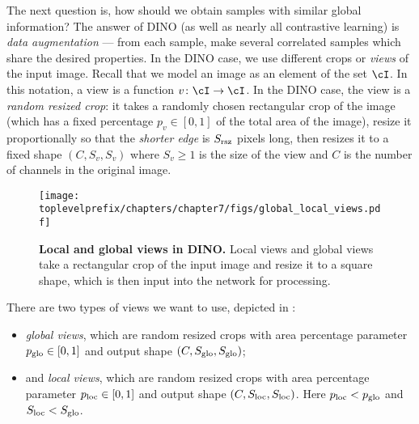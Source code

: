 \documentclass[\toplevelprefix/book-main.tex]{subfiles}
\begin{document}
The next question is, how should we obtain samples with similar global information? The answer of DINO (as well as nearly all contrastive learning) is \textit{data augmentation} --- from each sample, make several correlated samples which share the desired properties. In the DINO case, we use different crops or \textit{views} of the input image. Recall that we model an image as an element of the set \(\cI\). In this notation, a view is a function \(v \colon \cI \to \cI\). In the DINO case, the view is a \textit{random resized crop}: it takes a randomly chosen rectangular crop of the image (which has a fixed percentage \(p_{v} \in [0, 1]\) of the total area of the image), resize it proportionally so that the \textit{shorter edge} is \(S_{\mathrm{rsz}}\) pixels long, then resizes it to a fixed shape \((C, S_{v}, S_{v})\) where \(S_{v} \geq 1\) is the size of the view and \(C\) is the number of channels in the original image. 

\begin{figure}
    \centering 
    \texttt{[image: \\toplevelprefix/chapters/chapter7/figs/global\_local\_views.pdf]}
    \caption{\textbf{Local and global views in DINO.} Local views and global views take a rectangular crop of the input image and resize it to a square shape, which is then input into the network for processing.}
    \label{fig:dino_local_global_views}
\end{figure}

There are two types of views we want to use, depicted in : 
\begin{itemize}
    \item \textit{global views}, which are random resized crops with area percentage parameter \(p_{\mathrm{glo}} \in [0, 1]\) and output shape \((C, S_{\mathrm{glo}}, S_{\mathrm{glo}})\);
    \item and \textit{local views}, which are random resized crops with area percentage parameter \(p_{\mathrm{loc}} \in [0, 1]\) and output shape \((C, S_{\mathrm{loc}}, S_{\mathrm{loc}})\). Here \(p_{\mathrm{loc}} < p_{\mathrm{glo}}\) and \(S_{\mathrm{loc}} < S_{\mathrm{glo}}\).
\end{itemize}
\end{document}
